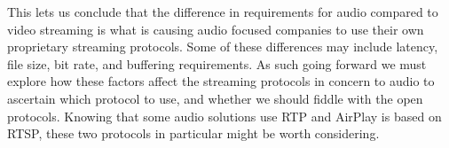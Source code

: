 This lets us conclude that the difference in requirements for audio compared to video streaming is what is causing audio focused companies to use their own proprietary streaming protocols.
Some of these differences may include latency, file size, bit rate, and buffering requirements.
As such going forward we must explore how these factors affect the streaming protocols in concern to audio to ascertain which protocol to use, and whether we should fiddle with the open protocols.
Knowing that some audio solutions use \ac{RTP} and AirPlay is based on \ac{RTSP}, these two protocols in particular might be worth considering.





